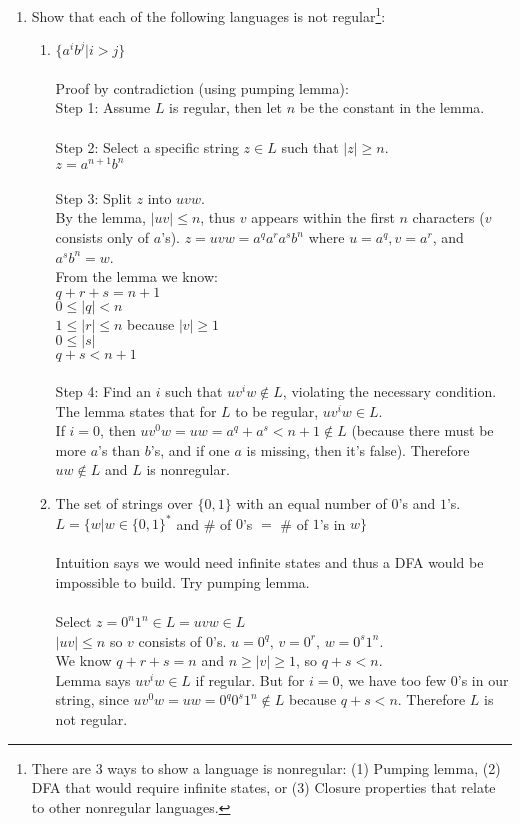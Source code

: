 \documentclass[10pt,a4paper,final]{article}
\begin{document}
\begin{enumerate}
\item %
Show that each of the following languages is not regular\footnote{There are 3 ways to show
a language is nonregular: (1) Pumping lemma, (2) DFA that would require infinite states, or (3)
Closure properties that relate to other nonregular languages.}:
  \begin{enumerate}
  \item $\{a^i b^j | i > j\}$\\
  \\
  Proof by contradiction (using pumping lemma):\\
  Step 1: Assume $L$ is regular, then let $n$ be the constant in the lemma.\\
  \\
  Step 2: Select a specific string $z \in L$ such that $|z| \geq n$.\\
  $z = a^{n+1} b^n$\\
  \\
  Step 3: Split $z$ into $uvw$.\\
  By the lemma, $|uv| \leq n$, thus $v$ appears within the first $n$ characters
  ($v$ consists only of $a$'s).
  $z = uvw = a^q a^r a^s b^n$ where $u = a^q, v = a^r$, and $a^s b^n = w$.\\
  From the lemma we know:\\
  $q+r+s = n+1$\\
  $0 \leq |q| < n$\\
  $1 \leq |r| \leq n$ because $|v| \geq 1$\\
  $0 \leq |s|$\\
  $q+s < n + 1$\\
  \\
  Step 4: Find an $i$ such that $uv^iw \notin L$, violating the necessary condition.\\
  The lemma states that for $L$ to be regular, $uv^iw \in L$.\\
  If $i=0$, then $uv^0w = uw = a^q + a^s < n+1 \notin L$ (because there must be more $a$'s than $b$'s,
  and if one $a$ is missing, then it's false). Therefore $uw \notin L$ and $L$ is nonregular.  
  
  \item The set of strings over $\{0,1\}$ with an equal number of $0$'s and $1$'s.\\
  $L = \{w | w \in \{0,1\}^*$ and \# of $0$'s $=$ \# of $1$'s in $w\}$\\
  \\
  Intuition says we would need infinite states and thus a DFA would be impossible to build.
  Try pumping lemma.\\
  \\
  Select $z = 0^n 1^n \in L = uvw \in L$\\
  $|uv| \leq n$ so $v$ consists of $0$'s. $u = 0^q,\,v=0^r,\,w=0^s1^n$.\\
  We know $q+r+s = n$ and $n \geq |v| \geq 1$, so $q+s < n$.\\
  Lemma says $uv^iw \in L$ if regular. But for $i=0$, we have too few $0$'s in our string, since
  $uv^0w = uw = 0^q 0^s 1^n \notin L$ because $q+s < n$. Therefore $L$ is not regular.
  

\end{enumerate}
\end{enumerate}
\end{document}
